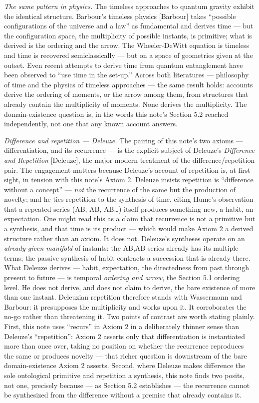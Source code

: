 \documentclass[
]{article}
\begin{document}
\emph{The same pattern in physics.} The timeless approaches to quantum
gravity exhibit the identical structure. Barbour's timeless physics
{[}Barbour{]} takes ``possible configurations of the universe and a
law'' as fundamental and derives time --- but the configuration space,
the multiplicity of possible instants, is primitive; what is derived is
the ordering and the arrow. The Wheeler-DeWitt equation is timeless and
time is recovered semiclassically --- but on a space of geometries given
at the outset. Even recent attempts to derive time from quantum
entanglement have been observed to ``use time in the set-up.'' Across
both literatures --- philosophy of time and the physics of timeless
approaches --- the same result holds: accounts derive the ordering of
moments, or the arrow among them, from structures that already contain
the multiplicity of moments. None derives the multiplicity. The
domain-existence question is, in the words this note's Section 5.2
reached independently, not one that any known account answers.

\emph{Difference and repetition --- Deleuze.} The pairing of this note's
two axioms --- differentiation, and its recurrence --- is the explicit
subject of Deleuze's \emph{Difference and Repetition} {[}Deleuze{]}, the
major modern treatment of the difference/repetition pair. The engagement
matters because Deleuze's account of repetition is, at first sight, in
tension with this note's Axiom 2. Deleuze insists repetition is
``difference without a concept'' --- \emph{not} the recurrence of the
same but the production of novelty; and he ties repetition to the
synthesis of time, citing Hume's observation that a repeated series (AB,
AB, AB\ldots) itself produces something new, a habit, an expectation.
One might read this as a claim that recurrence is not a primitive but a
synthesis, and that time is its product --- which would make Axiom 2 a
derived structure rather than an axiom. It does not. Deleuze's syntheses
operate on an \emph{already-given manifold} of instants: the AB,AB
series already has its multiple terms; the passive synthesis of habit
contracts a succession that is already there. What Deleuze derives ---
habit, expectation, the directedness from past through present to future
--- is temporal \emph{ordering and arrow}, the Section 5.1 ordering
level. He does not derive, and does not claim to derive, the bare
existence of more than one instant. Deleuzian repetition therefore
stands with Wassermann and Barbour: it presupposes the multiplicity and
works upon it. It corroborates the no-go rather than threatening it. Two
points of contrast are worth stating plainly. First, this note uses
``recurs'' in Axiom 2 in a deliberately thinner sense than Deleuze's
``repetition'': Axiom 2 asserts only that differentiation is
instantiated more than once over, taking no position on whether the
recurrence reproduces the same or produces novelty --- that richer
question is downstream of the bare domain-existence Axiom 2 asserts.
Second, where Deleuze makes difference the sole ontological primitive
and repetition a synthesis, this note finds two posits, not one,
precisely because --- as Section 5.2 establishes --- the recurrence
cannot be synthesized from the difference without a premise that already
contains it.
\end{document}
